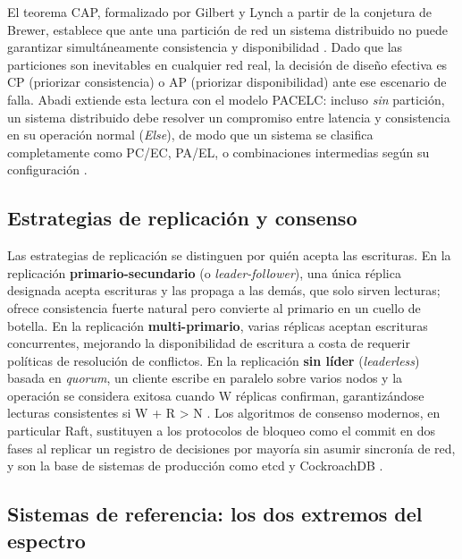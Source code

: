 \documentclass[12pt,letterpaper]{article}
\begin{document}
El teorema CAP, formalizado por Gilbert y Lynch a partir de la conjetura de
Brewer, establece que ante una partici\'on de red un sistema distribuido no
puede garantizar simult\'aneamente consistencia y disponibilidad
\cite{gilbert2002}. Dado que las particiones son inevitables en cualquier
red real, la decisi\'on de dise\~no efectiva es CP (priorizar consistencia)
o AP (priorizar disponibilidad) ante ese escenario de falla. Abadi
extiende esta lectura con el modelo PACELC: incluso \emph{sin} partici\'on,
un sistema distribuido debe resolver un compromiso entre latencia y
consistencia en su operaci\'on normal (\emph{Else}), de modo que un sistema
se clasifica completamente como PC/EC, PA/EL, o combinaciones intermedias
seg\'un su configuraci\'on \cite{abadi2012}.

\subsection{Estrategias de replicaci\'on y consenso}

Las estrategias de replicaci\'on se distinguen por qui\'en acepta las
escrituras. En la replicaci\'on \textbf{primario-secundario} (o
\emph{leader-follower}), una \'unica r\'eplica designada acepta escrituras
y las propaga a las dem\'as, que solo sirven lecturas; ofrece consistencia
fuerte natural pero convierte al primario en un cuello de botella. En la
replicaci\'on \textbf{multi-primario}, varias r\'eplicas aceptan escrituras
concurrentes, mejorando la disponibilidad de escritura a costa de requerir
pol\'iticas de resoluci\'on de conflictos. En la replicaci\'on
\textbf{sin l\'ider} (\emph{leaderless}) basada en \emph{quorum}, un
cliente escribe en paralelo sobre varios nodos y la operaci\'on se
considera exitosa cuando W r\'eplicas confirman, garantiz\'andose lecturas
consistentes si W + R > N \cite{tanenbaum2017}. Los algoritmos de consenso
modernos, en particular Raft, sustituyen a los protocolos de bloqueo como
el commit en dos fases al replicar un registro de decisiones por mayor\'ia
sin asumir sincron\'ia de red, y son la base de sistemas de producci\'on
como etcd y CockroachDB \cite{ongaro2014}.

\subsection{Sistemas de referencia: los dos extremos del espectro}
\end{document}
